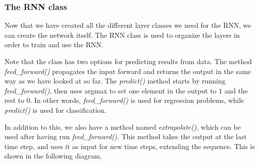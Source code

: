 \documentclass[11pt]{article}
\begin{document}
    \subsubsection{The RNN class}\label{the-rnn-class}

    Now that we have created all the different layer classes we need for the
RNN, we can create the network itself. The RNN class is used to organize
the layers in order to train and use the RNN.

Note that the class has two options for predicting results from data.
The method \emph{feed\_forward()} propagates the input forward and
returns the output in the same way as we have looked at so far. The
\emph{predict()} method starts by running \emph{feed\_forward()}, then
uses argmax to set one element in the output to \(1\) and the rest to
\(0\). In other words, \emph{feed\_forward()} is used for regression
problems, while \emph{predict()} is used for classification.

In addition to this, we also have a method named \emph{extrapolate()},
which can be used after having run \emph{feed\_forward()}. This method
takes the output at the last time step, and uses it as input for new
time steps, extending the sequence. This is shown in the following
diagram.

    
\end{document}
